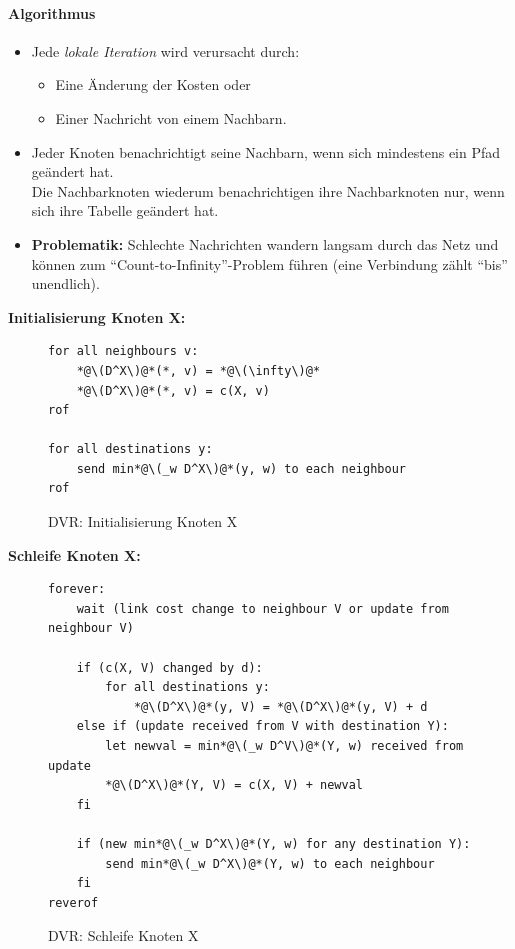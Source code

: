 \documentclass[a4paper, 11pt, accentcolor = tud3b]{tudreport}
\begin{document}
                \paragraph{Algorithmus}
	                \begin{itemize}
	                	\item Jede \textit{lokale Iteration} wird verursacht durch:
		                	\begin{itemize}
		                		\item Eine Änderung der Kosten oder
		                		\item Einer Nachricht von einem Nachbarn.
		                	\end{itemize}
		                \item Jeder Knoten benachrichtigt seine Nachbarn, wenn sich mindestens ein Pfad geändert hat. \\ Die Nachbarknoten wiederum benachrichtigen ihre Nachbarknoten nur, wenn sich ihre Tabelle geändert hat.
		                \item \textbf{Problematik:} Schlechte Nachrichten wandern langsam durch das Netz und können zum \enquote{Count-to-Infinity}-Problem führen (eine Verbindung zählt \enquote{bis} unendlich).
	                \end{itemize}
	                
	                \textbf{Initialisierung Knoten X:}
	                \begin{figure}[H]
	                	\centering
	                	\begin{lstlisting}
for all neighbours v:
	*@\(D^X\)@*(*, v) = *@\(\infty\)@*
	*@\(D^X\)@*(*, v) = c(X, v)
rof

for all destinations y:
	send min*@\(_w D^X\)@*(y, w) to each neighbour
rof
	                	\end{lstlisting}
	                	\caption{DVR: Initialisierung Knoten X}
	                \end{figure}
	                
	                \textbf{Schleife Knoten X:}
	                \begin{figure}[H]
	                	\centering
	                	\begin{lstlisting}
forever:
	wait (link cost change to neighbour V or update from neighbour V)

	if (c(X, V) changed by d):
		for all destinations y:
			*@\(D^X\)@*(y, V) = *@\(D^X\)@*(y, V) + d
	else if (update received from V with destination Y):
		let newval = min*@\(_w D^V\)@*(Y, w) received from update
		*@\(D^X\)@*(Y, V) = c(X, V) + newval
	fi

	if (new min*@\(_w D^X\)@*(Y, w) for any destination Y):
		send min*@\(_w D^X\)@*(Y, w) to each neighbour
	fi
reverof
	                	\end{lstlisting}
	                	\caption{DVR: Schleife Knoten X}
	                \end{figure}
\end{document}
